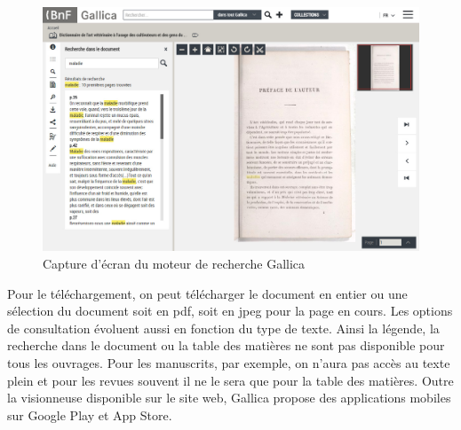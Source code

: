         \begin{figure}[ht!]
            \centering
            \includegraphics[width=1\textwidth]{figure/screenshot_gallica.jpg}
            \caption{Capture d'écran du moteur de recherche Gallica}
            \label{fig:gallica}
        \end{figure}

        Pour le téléchargement, on peut télécharger le document en entier ou une sélection du document soit en pdf, soit en jpeg pour la page en cours. Les options de consultation évoluent aussi en fonction du type de texte. Ainsi la légende, la recherche dans le document ou la table des matières ne sont pas disponible pour tous les ouvrages. Pour les manuscrits, par exemple, on n’aura pas accès au texte plein et pour les revues souvent il ne le sera que pour la table des matières. Outre la visionneuse disponible sur le site web, Gallica propose des applications mobiles sur Google Play et App Store.
